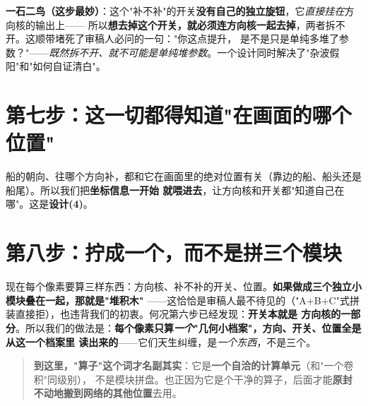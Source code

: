 \documentclass[UTF8,11pt,a4paper]{ctexart}
\begin{document}
\begin{tcolorbox}[colback=boxy!50,colframe=orange!60,boxrule=0.4pt,left=5pt,right=5pt,top=3pt,bottom=3pt,arc=2pt]
\textbf{一石二鸟（这步最妙）}：这个"补不补"的开关\textbf{没有自己的独立旋钮}，它\emph{直接挂在}方向核的输出上——
所以\textbf{想去掉这个开关，就必须连方向核一起去掉}，两者拆不开。这顺带堵死了审稿人必问的一句："你这点提升，
是不是只是单纯多堆了参数？"——\emph{既然拆不开、就不可能是单纯堆参数}。一个设计同时解决了"杂波假阳"和"如何自证清白"。
\end{tcolorbox}

\section{第七步：这一切都得知道"在画面的哪个位置"}
船的朝向、往哪个方向补，都和它在画面里的绝对位置有关（靠边的船、船头还是船尾）。所以我们把\textbf{坐标信息一开始
就喂进去}，让方向核和开关都"知道自己在哪"。这是\textbf{设计(4)}。

\section{第八步：拧成一个，而不是拼三个模块}
现在每个像素要算三样东西：方向核、补不补的开关、位置。\textbf{如果做成三个独立小模块叠在一起，那就是"堆积木"}
——这恰恰是审稿人最不待见的（"A+B+C"式拼装直接拒），也违背我们的初衷。何况第六步已经发现：\textbf{开关本就是
方向核的一部分}。所以我们的做法是：\textbf{每个像素只算\emph{一个}"几何小档案"，方向、开关、位置全是从这一个档案里
读出来的}——它们天生纠缠，是\emph{一个东西}，不是三个。

\begin{quote}
\textbf{到这里，"算子"这个词才名副其实}：它是\textbf{一个自洽的计算单元}（和"一个卷积"同级别），
不是模块拼盘。也正因为它是个干净的算子，后面才能\textbf{原封不动地搬到网络的其他位置}去用。
\end{quote}
\end{document}
